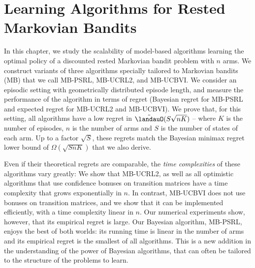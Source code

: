\begingroup

\let\clearpage\relax

\chapter{Learning Algorithms for Rested Markovian Bandits}
\label{ch:learning_rested}

In this chapter, we study the scalability of model-based algorithms learning the optimal policy of a discounted rested Markovian bandit problem with $n$ arms. %
We construct variants of three algorithms specially tailored to Markovian bandits (MB) that we call MB-PSRL, MB-UCRL2, and MB-UCBVI. We consider an episodic setting with geometrically distributed episode length, and measure the performance of the algorithm in terms of regret (Bayesian regret for MB-PSRL and expected regret for MB-UCRL2 and MB-UCBVI). We prove that, for this setting, all algorithms have a low regret in $\tilde{\landauO}(S\sqrt{nK})$ -- where $K$ is the number of episodes, $n$ is the number of arms and $S$ is the number of states of each arm. Up to a factor $\sqrt{S}$, these regrets match the Bayesian minimax regret lower bound of $\Omega(\sqrt{SnK})$ that we also derive.

Even if their theoretical regrets are comparable, the \emph{time complexities} of these algorithms vary greatly: We show that MB-UCRL2, as well as all optimistic algorithms that use confidence bonuses on transition matrices have a {time} complexity that grows exponentially in $n$. In contrast, MB-UCBVI does not use bonuses on transition matrices, and we show that  it can be implemented efficiently, with a time complexity linear in $n$. Our numerical experiments show, however, that its empirical regret is large. Our Bayesian algorithm, MB-PSRL, enjoys the best of both worlds: its running time is linear in the number of arms and its empirical regret is the smallest of all algorithms.
This is a new addition in the understanding of the power of Bayesian algorithms, that can often be  tailored to the structure of the problems to learn.

